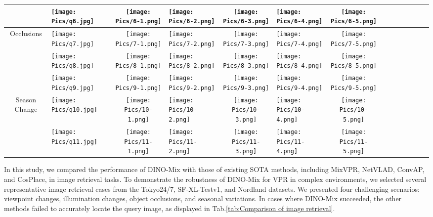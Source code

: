 \begin{table*}[!t]
\begin{tabular}{c p{2cm} c p{2cm} c p{2cm} c p{2cm} c p{2cm} c p{2cm} c p{2cm}}
    &\texttt{[image: Pics/q6.jpg]}& \texttt{[image: Pics/6-1.png]}&\texttt{[image: Pics/6-2.png]}&\texttt{[image: Pics/6-3.png]}&\texttt{[image: Pics/6-4.png]}&\texttt{[image: Pics/6-5.png]} \\
    \hline
    Occlusions&\texttt{[image: Pics/q7.jpg]}& \texttt{[image: Pics/7-1.png]}&\texttt{[image: Pics/7-2.png]}&\texttt{[image: Pics/7-3.png]}&\texttt{[image: Pics/7-4.png]}&\texttt{[image: Pics/7-5.png]} \\
    
   &\texttt{[image: Pics/q8.jpg]}& \texttt{[image: Pics/8-1.png]}&\texttt{[image: Pics/8-2.png]}&\texttt{[image: Pics/8-3.png]}&\texttt{[image: Pics/8-4.png]}&\texttt{[image: Pics/8-5.png]} \\
    
    &\texttt{[image: Pics/q9.jpg]}& \texttt{[image: Pics/9-1.png]}&\texttt{[image: Pics/9-2.png]}&\texttt{[image: Pics/9-3.png]}&\texttt{[image: Pics/9-4.png]}&\texttt{[image: Pics/9-5.png]} \\
    \hline
    Season Change &\texttt{[image: Pics/q10.jpg]}& \texttt{[image: Pics/10-1.png]}&\texttt{[image: Pics/10-2.png]}&\texttt{[image: Pics/10-3.png]}&\texttt{[image: Pics/10-4.png]}&\texttt{[image: Pics/10-5.png]} \\
    
    &\texttt{[image: Pics/q11.jpg]}& \texttt{[image: Pics/11-1.png]}&\texttt{[image: Pics/11-2.png]}&\texttt{[image: Pics/11-3.png]}&\texttt{[image: Pics/11-4.png]}&\texttt{[image: Pics/11-5.png]} \\
    \hline
    \end{tabular}
    \label{tab:Comparison of image retrieval}
    \end{table*}
    
    In this study, we compared the performance of DINO-Mix with those of existing SOTA methods, including MixVPR, NetVLAD, ConvAP, and CosPlace, in image retrieval tasks. To demonstrate the robustness of DINO-Mix for VPR in complex environments, we selected several representative image retrieval cases from the Tokyo24/7, SF-XL-Testv1, and Nordland datasets. We presented four challenging scenarios: viewpoint changes, illumination changes, object occlusions, and seasonal variations. In cases where DINO-Mix succeeded, the other methods failed to accurately locate the query image, as displayed in Tab.\ref{tab:Comparison of image retrieval}.
    
